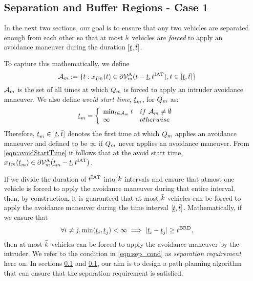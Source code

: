 \subsection{Separation and Buffer Regions - Case 1} \label{sec:case1}
In the next two sections, our goal is to ensure that any two vehicles are separated enough from each other so that %
at most $\bar{k}$ vehicles are \textit{forced} to apply an avoidance maneuver during the duration $[\underline{t}, \bar{t}]$. 

To capture this mathematically, we define 
\begin{equation} \label{eqn:avoidStartTime}
\avoidt_{m} := \{t: \state_{\intr m}(t) \in \partial\brs^{\text{A}}_{m}(t-\tsa, \iat), t \in [\tsa, \tea]\}
\end{equation} 
$\mathcal{A}_{m}$ is the set of all times at which $Q_m$ is forced to apply an intruder avoidance maneuver. We also define \textit{avoid start time}, $\underline{t}_m$, for $Q_m$ as:
\begin{equation} \label{eqn:avoidStartTime2}
\tsa_m  = 
\left \{ 
\begin{array}{ll}
\min_{t \in  \avoidt_{m}} t & \mbox{if~} \avoidt_{m} \neq \emptyset\\
\infty & \mbox{otherwise}
\end{array}
\right.
\end{equation}  
Therefore, $\underline{t}_m \in [\underline{t}, \bar{t}]$ denotes the first time at which $Q_m$ applies an avoidance maneuver and defined to be $\infty$ if $Q_m$ never applies an avoidance maneuver. From \eqref{eqn:avoidStartTime} it follows that at the avoid start time, $x_{I m}(\underline{t}_m) \in  \partial\mathcal{V}^{\text{A}}_{m}(\underline{t}_m-\underline{t}, t^\text{IAT})$. %
 
If we divide the duration of $t^\text{IAT}$ into $\bar{k}$ intervals and ensure that atmost one vehicle is forced to apply the avoidance maneuver during that entire interval, then, by construction, it is guaranteed that at most $\bar{k}$ vehicles can be forced to apply the avoidance maneuver during the time interval $[\underline{t}, \bar{t}]$. Mathematically, if we ensure that 
\begin{equation} \label{eqn:sep_cond}
\forall i \neq j, \min(\tsa_i, \tsa_j)< \infty \implies |\tsa_i - \tsa_j| \geq \brd,
\end{equation}
then at most $\bar{k}$ vehicles can be forced to apply the avoidance maneuver by the intruder. We refer to the condition in \eqref{eqn:sep_cond} as \textit{separation requirement} here on. In sections \ref{sec:case1} and \ref{sec:case1}, our aim is to design a path planning algorithm that can ensure that the separation requirement is satisfied.   

